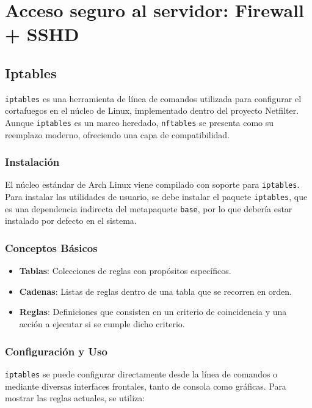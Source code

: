 \newpage
\section{Acceso seguro al servidor: Firewall + SSHD}

\subsection{Iptables}

\texttt{iptables} es una herramienta de línea de comandos utilizada para configurar el cortafuegos en el núcleo de Linux, implementado dentro del proyecto Netfilter. Aunque \texttt{iptables} es un marco heredado, \texttt{nftables} se presenta como su reemplazo moderno, ofreciendo una capa de compatibilidad. 

\subsubsection{Instalación}

El núcleo estándar de Arch Linux viene compilado con soporte para \texttt{iptables}. Para instalar las utilidades de usuario, se debe instalar el paquete \texttt{iptables}, que es una dependencia indirecta del metapaquete \texttt{base}, por lo que debería estar instalado por defecto en el sistema. 

\subsubsection{Conceptos Básicos}

\begin{itemize}
    \item \textbf{Tablas}: Colecciones de reglas con propósitos específicos.
    \item \textbf{Cadenas}: Listas de reglas dentro de una tabla que se recorren en orden.
    \item \textbf{Reglas}: Definiciones que consisten en un criterio de coincidencia y una acción a ejecutar si se cumple dicho criterio.
\end{itemize}

\subsubsection{Configuración y Uso}

\texttt{iptables} se puede configurar directamente desde la línea de comandos o mediante diversas interfaces frontales, tanto de consola como gráficas. Para mostrar las reglas actuales, se utiliza:

